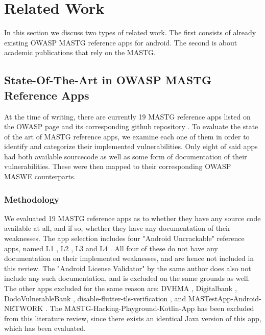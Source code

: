 

\chapter{Related Work}
\label{c:related_work}

In this section we discuss two types of related work. The first consists of already existing OWASP MASTG reference apps for android. The second is about academic publications that rely on the MASTG.



\section{State-Of-The-Art in OWASP MASTG Reference Apps}
At the time of writing, there are currently 19 MASTG reference apps listed on the OWASP page \citep{owasp_reference_app_website} and its corresponding github repository \citep{mastg_repo_apps_overview}. To evaluate the state of the art of MASTG reference apps, we examine each one of them in order to identify and categorize their implemented vulnerabilities. Only eight of said apps had both available sourcecode as well as some form of documentation of their vulnerabilities. These were then mapped to their corresponding OWASP MASWE counterparts.

\subsection{Methodology}
We evaluated 19 MASTG reference apps as to whether they have any source code available at all, and if so, whether they have any documentation of their weaknesses. The app selection includes four "Android Uncrackable" reference apps, named L1 \citep{android_uncrackable_l1}, L2 \citep{android_uncrackable_l2}, L3 \citep{android_uncrackable_l3} and L4 \citep{android_uncrackable_l4}. All four of these do not have any documentation on their implemented weaknesses, and are hence not included in this review. The "Android License Validator" \citep{license_validator} by the same author does also not include any such documentation, and is excluded on the same grounds as well. The other apps excluded for the same reason are: DVHMA \citep{dvhma}, Digitalbank \citep{digitalbank}, DodoVulnerableBank \citep{dodo_vulnerable_bank}, disable-flutter-tls-verification \citep{disable_flutter_verification_app}, and MASTestApp-Android-NETWORK \citep{mast_test_app_android_network}. The MASTG-Hacking-Playground-Kotlin-App \citep{mastg_hacking_playground_kotlin} has been excluded from this literature review, since there exists an identical Java version of this app, which has been evaluated. 


